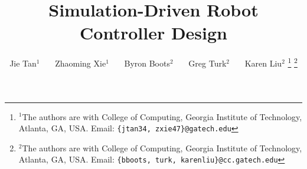 \documentclass[letterpaper, 10 pt, conference]{ieeeconf}  %
\title{\LARGE \bf
Simulation-Driven Robot Controller Design
}
\author{Jie Tan$^{1}$ ~~~Zhaoming Xie$^{1}$ ~~~Byron Boots$^{2}$ ~~~Greg Turk$^{2}$ ~~~Karen Liu$^{2}$%
\thanks{$^{1}$The authors are with College of Computing, Georgia Institute of Technology, Atlanta, GA, USA. Email:
        {\tt\small \{jtan34, zxie47\}@gatech.edu}}%
\thanks{$^{2}$The authors are with College of Computing, Georgia Institute of Technology, Atlanta, GA, USA. Email:
        {\tt\small \{bboots, turk, karenliu\}@cc.gatech.edu}}%
}
\begin{document}
\maketitle
\thispagestyle{empty}
\pagestyle{empty}


\begin{abstract}

\end{abstract}











\end{document}
